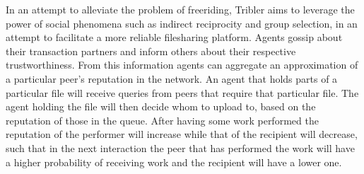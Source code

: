 \documentclass[11pt,a4paper]{report}
\theoremstyle{definition}
\theoremstyle{theorem}
\theoremstyle{proposition}
\theoremstyle{corollary}
\theoremstyle{lemma}
\theoremstyle{example}
\theoremstyle{remark}
\begin{document}
\noindent{}In an attempt to alleviate the problem of freeriding, Tribler aims to leverage the power of social phenomena such as indirect reciprocity and group selection, in an attempt to facilitate a more reliable filesharing platform. Agents gossip about their transaction partners and inform others about their respective trustworthiness. From this information agents can aggregate an approximation of a particular peer's reputation in the network. An agent that holds parts of a particular file will receive queries from peers that require that particular file. The agent holding the file will then decide whom to upload to, based on the reputation of those in the queue. After having some work performed the reputation of the performer will increase while that of the recipient will decrease, such that in the next interaction the peer that has performed the work will have a higher probability of receiving work and the recipient will have a lower one. \vspace{1em}\\

\end{document}
